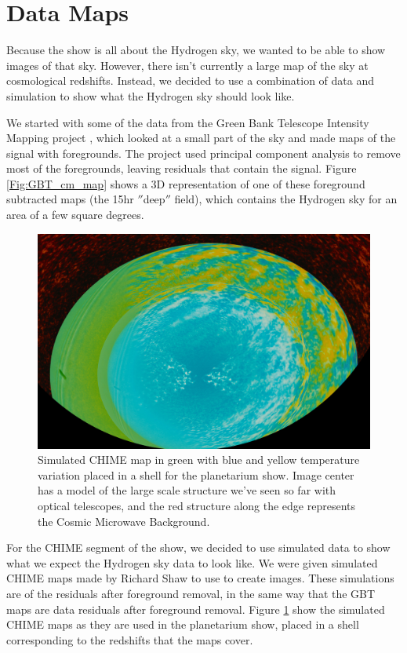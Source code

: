 \section{\cm Data Maps}

Because the show is all about the Hydrogen sky, we wanted to be able to show images of that sky. However, there isn't currently a large map of the \cm sky at cosmological redshifts. Instead, we decided to use a combination of data and simulation to show what the Hydrogen sky should look like.

We started with some of the data from the Green Bank Telescope Intensity Mapping project \cite{masui_2012}\cite{switzer_2013}, which looked at a small part of the sky and made maps of the \cm signal with foregrounds. The project used principal component analysis to remove most of the foregrounds, leaving residuals that contain the \cm signal. Figure \ref{Fig:GBT_cm_map} shows a 3D representation of one of these foreground subtracted maps (the 15hr $''$deep$''$ field), which contains the Hydrogen sky for an area of a few square degrees. 

\begin{figure}[htb]
\begin{center}
\includegraphics[width=0.95\linewidth]{Planetarium/figures/CHIME_cm_map.jpg}
\caption{Simulated CHIME map in green with blue and yellow temperature variation placed in a shell for the planetarium show. Image center has a model of the large scale structure we've seen so far with optical telescopes, and the red structure along the edge represents the Cosmic Microwave Background.  }
\label{Fig:CHIME_cm_map}
\end{center}
\end{figure}

For the CHIME segment of the show, we decided to use simulated data to show what we expect the Hydrogen sky data to look like. We were given simulated CHIME \cm maps made by Richard Shaw \cite{shaw_2014} to use to create images. These simulations are of the \cm residuals after foreground removal, in the same way that the GBT maps are data residuals after foreground removal. Figure \ref{Fig:CHIME_cm_map} show the simulated CHIME maps as they are used in the planetarium show, placed in a shell corresponding to the redshifts that the maps cover. 



